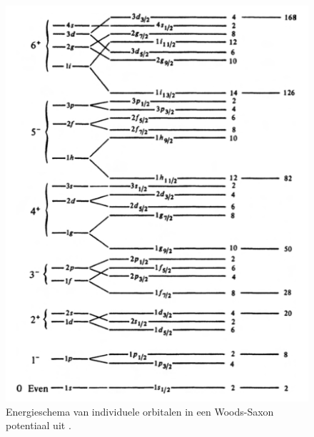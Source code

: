 \documentclass[11pt,twoside]{book}
\begin{document}
\begin{figure}[H]
\centering
\includegraphics[scale=0.55]{./figuren/opvulling_WS.png}
\caption{Energieschema van individuele orbitalen in een Woods-Saxon potentiaal uit \cite{henley}.}
\label{fig:WS_opvulling}
\end{figure}
\end{document}
